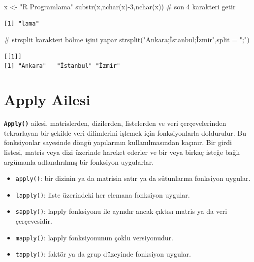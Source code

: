 \documentclass[
  letterpaper,
  DIV=11,
  numbers=noendperiod]{scrreprt}
\newenvironment{Shaded}{\begin{snugshade}}{\end{snugshade}}
\newcommand{\AttributeTok}[1]{\textcolor[rgb]{0.40,0.45,0.13}{#1}}
\newcommand{\CommentTok}[1]{\textcolor[rgb]{0.37,0.37,0.37}{#1}}
\newcommand{\DecValTok}[1]{\textcolor[rgb]{0.68,0.00,0.00}{#1}}
\newcommand{\FunctionTok}[1]{\textcolor[rgb]{0.28,0.35,0.67}{#1}}
\newcommand{\NormalTok}[1]{\textcolor[rgb]{0.00,0.23,0.31}{#1}}
\newcommand{\OtherTok}[1]{\textcolor[rgb]{0.00,0.23,0.31}{#1}}
\newcommand{\SpecialCharTok}[1]{\textcolor[rgb]{0.37,0.37,0.37}{#1}}
\newcommand{\StringTok}[1]{\textcolor[rgb]{0.13,0.47,0.30}{#1}}
\begin{document}
\begin{Shaded}
\begin{Highlighting}[]
\NormalTok{x }\OtherTok{\textless{}{-}} \StringTok{"R Programlama"}
\FunctionTok{substr}\NormalTok{(x,}\FunctionTok{nchar}\NormalTok{(x)}\SpecialCharTok{{-}}\DecValTok{3}\NormalTok{,}\FunctionTok{nchar}\NormalTok{(x)) }\CommentTok{\# son 4 karakteri getir}
\end{Highlighting}
\end{Shaded}

\begin{verbatim}
[1] "lama"
\end{verbatim}

\begin{Shaded}
\begin{Highlighting}[]
\CommentTok{\# strsplit karakteri bölme işini yapar}
\FunctionTok{strsplit}\NormalTok{(}\StringTok{"Ankara;İstanbul;İzmir"}\NormalTok{,}\AttributeTok{split =} \StringTok{";"}\NormalTok{)}
\end{Highlighting}
\end{Shaded}

\begin{verbatim}
[[1]]
[1] "Ankara"   "İstanbul" "İzmir"   
\end{verbatim}

\chapter{Apply Ailesi}\label{apply-ailesi}

\textbf{\texttt{Apply()}} ailesi, matrislerden, dizilerden, listelerden
ve veri çerçevelerinden tekrarlayan bir şekilde veri dilimlerini işlemek
için fonksiyonlarla doldurulur. Bu fonksiyonlar sayesinde döngü
yapılarının kullanılmasından kaçınır. Bir girdi listesi, matris veya
dizi üzerinde hareket ederler ve bir veya birkaç isteğe bağlı argümanla
adlandırılmış bir fonksiyon uygularlar.

\begin{itemize}
\item
  \texttt{apply()}: bir dizinin ya da matrisin satır ya da sütunlarına
  fonksiyon uygular.
\item
  \texttt{lapply()}: liste üzerindeki her elemana fonksiyon uygular.
\item
  \texttt{sapply()}: lapply fonksiyonu ile aynıdır ancak çıktısı matris
  ya da veri çerçevesidir.
\item
  \texttt{mapply()}: lapply fonksiyonunun çoklu versiyonudur.
\item
  \texttt{tapply()}: faktör ya da grup düzeyinde fonksiyon uygular.
\end{itemize}
\end{document}
